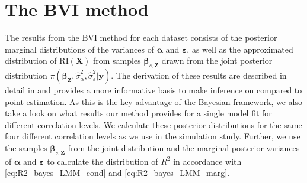 \section{The BVI method}
The results from the BVI method for each dataset consists of the posterior marginal distributions of the variances of $\boldsymbol{\alpha}$ and $\boldsymbol{\varepsilon}$, as well as the approximated distribution of $\text{RI}(\mathbf{X})$ from samples $\boldsymbol{\beta}_{s, \mathbf{Z}}$ drawn from the joint posterior distribution $\pi(\boldsymbol{\beta}_{\mathbf{Z}}, \hat{\sigma}^2_{\alpha}, \hat{\sigma}^2_{\varepsilon} \lvert \mathbf{y})$.
The derivation of these results are described in detail in  and provides a more informative basis to make inference on compared to point estimation.
As this is the key advantage of the Bayesian framework, we also take a look on what results our method provides for a single model fit for different correlation levels. 
We calculate these posterior distributions for the same four different correlation levels as we use in the simulation study.
Further, we use the samples $\boldsymbol{\beta}_{s, \mathbf{Z}}$ from the joint distribution and the marginal posterior variances of $\boldsymbol{\alpha}$ and $\boldsymbol{\varepsilon}$ to calculate the distribution of $R^2$ in accordance with \eqref{eq:R2_bayes_LMM_cond} and \eqref{eq:R2_bayes_LMM_marg}. 

